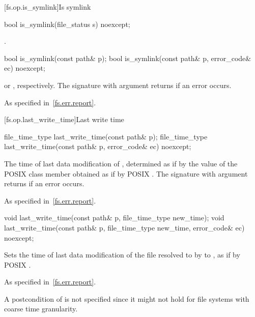 [fs.op.is_symlink]{Is symlink}

%
\begin{itemdecl}
bool is_symlink(file_status s) noexcept;
\end{itemdecl}

\begin{itemdescr}
\pnum
\returns {}.
\end{itemdescr}

%
\begin{itemdecl}
bool is_symlink(const path& p);
bool is_symlink(const path& p, error_code& ec) noexcept;
\end{itemdecl}

\begin{itemdescr}
\pnum
\returns {} or ,
  respectively. The signature with argument  returns 
  if an error occurs.

\pnum
\throws As specified in~\ref{fs.err.report}.
\end{itemdescr}


[fs.op.last_write_time]{Last write time}

%
\begin{itemdecl}
file_time_type last_write_time(const path& p);
file_time_type last_write_time(const path& p, error_code& ec) noexcept;
\end{itemdecl}

\begin{itemdescr}
\pnum
\returns The time of last data modification of ,
  determined as if by the value of the POSIX  class member 
  obtained as if by POSIX .
  The signature with argument  returns 
  if an error occurs.

\pnum
\throws As specified in~\ref{fs.err.report}.
\end{itemdescr}

%
\begin{itemdecl}
void last_write_time(const path& p, file_time_type new_time);
void last_write_time(const path& p, file_time_type new_time,
                     error_code& ec) noexcept;
\end{itemdecl}

\begin{itemdescr}
\pnum
\effects Sets the time of last data modification of the file
  resolved to by  to , as if by POSIX .

\pnum
\throws As specified in~\ref{fs.err.report}.

\pnum
\begin{note} A postcondition of  is not specified since it might not hold for file systems
  with coarse time granularity. \end{note}
\end{itemdescr}

